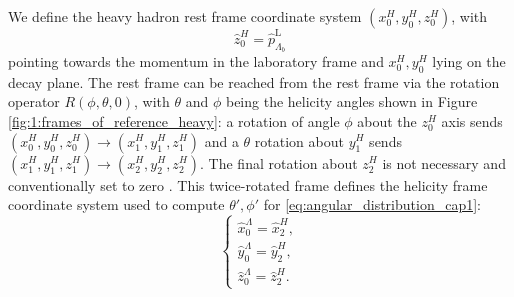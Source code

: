 We define the heavy hadron \lbz rest frame coordinate system $(x_0^H, y_0^H, z_0^H)$, with
\begin{equation}
	\hat{z}_0^H = \hat{p}_{\Lambda_b}^\text{L}
\end{equation}
pointing towards the \lbz momentum in the laboratory frame and $x_0^H, y_0^H$ lying on the \demonstratorshort decay plane.
The \slambda rest frame can be reached from the \lbz rest frame via the rotation operator $R(\phi,\theta,0)$, with $\theta$ and $\phi$ being the \lz helicity angles shown in Figure \ref{fig:1:frames_of_reference_heavy}:
a rotation of angle $\phi$ about the $z_0^H$ axis sends
$(x_0^H, y_0^H, z_0^H) \rightarrow (x_1^H, y_1^H, z_1^H)$ and a $\theta$ rotation about  $y_1^H$ sends $(x_1^H, y_1^H, z_1^H) \rightarrow (x_2^H, y_2^H, z_2^H)$.
The final rotation about $z_2^H$ is not necessary and conventionally set to zero \cite{Richman:153636} \cite{Jurik:2206806}.
This twice-rotated frame defines the \slambda helicity frame coordinate system used to compute $\theta',\phi'$ for \eqref{eq:angular_distribution_cap1}:
\begin{equation}
	\begin{cases}
		\hat{x}_0^\Lambda = \hat{x}_2^H, \\
		\hat{y}_0^\Lambda = \hat{y}_2^H, \\
		\hat{z}_0^\Lambda = \hat{z}_2^H.
	\end{cases}
\end{equation}

